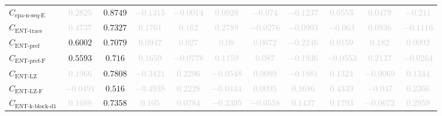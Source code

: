 \documentclass{standalone}
\newcommand{\enttracename}{\text{ENT-trace}}
\newcommand{\enttrace}{C_{\enttracename}}
\newcommand{\entprefixname}{\text{ENT-pref}}
\newcommand{\entprefix}{C_{\entprefixname}}
\newcommand{\entprefixflatname}{\text{ENT-pref-F}}
\newcommand{\entprefixflat}{C_{\entprefixflatname}}
\newcommand{\entlempelzivname}{\text{ENT-LZ}}
\newcommand{\entlempelziv}{C_{\entlempelzivname}}
\newcommand{\entlempelzivflatname}{\text{ENT-LZ-F}}
\newcommand{\entlempelzivflat}{C_{\entlempelzivflatname}}
\newcommand{\entkblockdonename}{\text{ENT-k-block-d1}}
\newcommand{\entkblockdone}{C_{\entkblockdonename}}
\newcommand{\epanormsequenceename}{\text{epa-n-seq-E}}
\newcommand{\epanormsequencee}{C_{\epanormsequenceename}}
\begin{document}
\begin{tabular}{lcccccccccc}
$\epanormsequencee$ & \textcolor{lightgray}{$0.2825$} & $0.8749$ & \textcolor{lightgray}{$-0.1315$} & \textcolor{lightgray}{$-0.0014$} & \textcolor{lightgray}{$0.0928$} & \textcolor{lightgray}{$-0.074$} & \textcolor{lightgray}{$-0.1237$} & \textcolor{lightgray}{$0.0553$} & \textcolor{lightgray}{$0.0479$} & \textcolor{lightgray}{$-0.211$} \\ 
$\enttrace$ & \textcolor{lightgray}{$0.4737$} & $0.7327$ & \textcolor{lightgray}{$0.1761$} & \textcolor{lightgray}{$0.162$} & \textcolor{lightgray}{$0.2789$} & \textcolor{lightgray}{$-0.0276$} & \textcolor{lightgray}{$-0.0903$} & \textcolor{lightgray}{$-0.063$} & \textcolor{lightgray}{$0.0836$} & \textcolor{lightgray}{$-0.1116$} \\ 
$\entprefix$ & $0.6002$ & $0.7079$ & \textcolor{lightgray}{$0.0947$} & \textcolor{lightgray}{$0.027$} & \textcolor{lightgray}{$0.08$} & \textcolor{lightgray}{$0.0672$} & \textcolor{lightgray}{$-0.2246$} & \textcolor{lightgray}{$0.0159$} & \textcolor{lightgray}{$0.182$} & \textcolor{lightgray}{$0.0092$} \\ 
$\entprefixflat$ & $0.5593$ & $0.716$ & \textcolor{lightgray}{$0.1659$} & \textcolor{lightgray}{$-0.0778$} & \textcolor{lightgray}{$0.1159$} & \textcolor{lightgray}{$0.087$} & \textcolor{lightgray}{$-0.1936$} & \textcolor{lightgray}{$-0.0553$} & \textcolor{lightgray}{$0.2137$} & \textcolor{lightgray}{$-0.0264$} \\ 
$\entlempelziv$ & \textcolor{lightgray}{$0.1966$} & $0.7808$ & \textcolor{lightgray}{$-0.3421$} & \textcolor{lightgray}{$0.2296$} & \textcolor{lightgray}{$-0.0548$} & \textcolor{lightgray}{$0.0089$} & \textcolor{lightgray}{$-0.1881$} & \textcolor{lightgray}{$0.1324$} & \textcolor{lightgray}{$-0.0069$} & \textcolor{lightgray}{$0.1344$} \\ 
$\entlempelzivflat$ & \textcolor{lightgray}{$-0.0491$} & $0.516$ & \textcolor{lightgray}{$-0.4938$} & \textcolor{lightgray}{$0.2228$} & \textcolor{lightgray}{$-0.0444$} & \textcolor{lightgray}{$0.0095$} & \textcolor{lightgray}{$0.1686$} & \textcolor{lightgray}{$0.4339$} & \textcolor{lightgray}{$-0.047$} & \textcolor{lightgray}{$0.2366$} \\ 
$\entkblockdone$ & \textcolor{lightgray}{$0.1688$} & $0.7358$ & \textcolor{lightgray}{$0.105$} & \textcolor{lightgray}{$0.0784$} & \textcolor{lightgray}{$-0.3395$} & \textcolor{lightgray}{$-0.0558$} & \textcolor{lightgray}{$0.1437$} & \textcolor{lightgray}{$0.1793$} & \textcolor{lightgray}{$-0.0672$} & \textcolor{lightgray}{$0.2959$} \\ 

\end{tabular}
\end{document}
